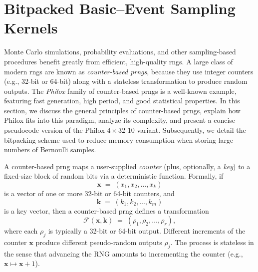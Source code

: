 \chapter{Bitpacked Basic--Event Sampling Kernels}
\label{ch:prng-kernels}

Monte Carlo simulations, probability evaluations, and other sampling-based procedures benefit greatly from efficient, high-quality \acrfull{rng}s. A large class of modern \acrshort{rng}s are known as \textit{counter-based \acrfull{prng}s}, because they use integer counters (e.g., 32-bit or 64-bit) along with a stateless transformation to produce random outputs. The \emph{Philox} family of counter-based \acrshort{prng}s is a well-known example, featuring fast generation, high period, and good statistical properties. In this section, we discuss the general principles of counter-based \acrshort{prng}s, explain how Philox fits into this paradigm, analyze its complexity, and present a concise pseudocode version of the \(\text{Philox }4\times32\text{-10}\) variant. Subsequently, we detail the bitpacking scheme used to reduce memory consumption when storing large numbers of Bernoulli samples.

A counter-based \acrshort{prng} maps a user-supplied \emph{counter} (plus, optionally, a \emph{key}) to a fixed-size block of random bits via a deterministic function. Formally, if 
\[
  \mathbf{x} \;=\; (x_1, x_2, \ldots, x_k)
\]
is a vector of one or more 32-bit or 64-bit counters, and 
\[
  \mathbf{k} \;=\; (k_1, k_2, \ldots, k_m)
\]
is a key vector, then a counter-based \acrshort{prng} defines a transformation 
\[
   \mathcal{F}(\mathbf{x}, \mathbf{k})
   \;=\;
   (\rho_1, \rho_2, \ldots, \rho_r),
\]
where each \(\rho_j\) is typically a 32-bit or 64-bit output. Different increments of the counter \(\mathbf{x}\) produce different pseudo-random outputs \(\rho_j\). The process is stateless in the sense that advancing the RNG amounts to incrementing the counter (e.g., \(\mathbf{x}\mapsto \mathbf{x} + 1\)).

